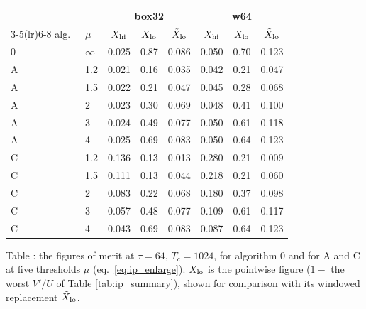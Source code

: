 \documentclass{article}
\numberwithin{equation}{section}   %
\begin{document}
\begin{center}\small
\begin{tabular}{ll ccc ccc}
\toprule
 & & \multicolumn{3}{c}{box32} & \multicolumn{3}{c}{w64} \\
\cmidrule(lr){3-5}\cmidrule(lr){6-8}
alg.\ & $\mu$ & $X_{\rm hi}$ & $X_{\rm lo}$ & $\tilde X_{\rm lo}$ & $X_{\rm hi}$ & $X_{\rm lo}$ & $\tilde X_{\rm lo}$ \\
\midrule
0 & $\infty$ & 0.025 & 0.87 & 0.086 & 0.050 & 0.70 & 0.123 \\
\midrule
A & 1.2 & 0.021 & 0.16 & 0.035 & 0.042 & 0.21 & 0.047 \\
A & 1.5 & 0.022 & 0.21 & 0.047 & 0.045 & 0.28 & 0.068 \\
A & 2   & 0.023 & 0.30 & 0.069 & 0.048 & 0.41 & 0.100 \\
A & 3   & 0.024 & 0.49 & 0.077 & 0.050 & 0.61 & 0.118 \\
A & 4   & 0.025 & 0.69 & 0.083 & 0.050 & 0.64 & 0.123 \\
\midrule
C & 1.2 & 0.136 & 0.13 & 0.013 & 0.280 & 0.21 & 0.009 \\
C & 1.5 & 0.111 & 0.13 & 0.044 & 0.218 & 0.21 & 0.060 \\
C & 2   & 0.083 & 0.22 & 0.068 & 0.180 & 0.37 & 0.098 \\
C & 3   & 0.057 & 0.48 & 0.077 & 0.109 & 0.61 & 0.117 \\
C & 4   & 0.043 & 0.69 & 0.083 & 0.087 & 0.64 & 0.123 \\
\bottomrule
\end{tabular}
\end{center}
\noindent Table \thetable\label{tab:ip_fom}: the figures of merit at $\tau = 64$,
$T_c = 1024$, for algorithm 0 and for A and C at five thresholds $\mu$ (eq.\ \ref{eq:ip_enlarge}).
$X_{\rm lo}$ is the pointwise figure ($1 -$ the worst $V'/U$ of Table \ref{tab:ip_summary}), shown for
comparison with its windowed replacement $\tilde X_{\rm lo}$.
\end{document}
